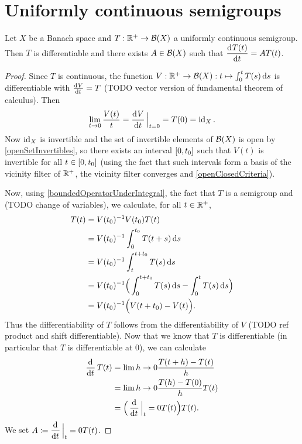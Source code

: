 \section{Uniformly continuous semigroups}

\begin{proposition}
Let $X$ be a Banach space and $T: \mathbb{R}^+\to \operatorname{\mathcal{B}}(X)$ a uniformly continuous semigroup. Then $T$ is differentiable and there exists $A\in \operatorname{\mathcal{B}}(X)$ such that $\mathinner{ \dfrac{\operatorname{d \!}{^{}}T(t)}{\operatorname{d \!}{{t}^{}}} } = AT(t)$.
\end{proposition}
\begin{proof}
Since $T$ is continuous, the function $V: \mathbb{R}^+ \to \operatorname{\mathcal{B}}(X): t\mapsto \int_0^t T(s)\operatorname{d \!}{s}$ is differentiable with $\od{V}{t} = T$ (TODO vector version of fundamental theorem of calculus). Then
\[ \lim_{t\to 0}\frac{V(t)}{t} = \mathinner{ \dfrac{\operatorname{d \!}{^{}}V}{\operatorname{d \!}{{t}^{}}} }\Big|_{t=0} = T(0) = \operatorname{id}_X. \]
Now $\operatorname{id}_X$ is invertible and the set of invertible elements of $\operatorname{\mathcal{B}}(X)$ is open by \ref{openSetInvertibles}, so there exists an interval $\interval{0,t_0}$ such that $V(t)$ is invertible for all $t\in \interval{0,t_0}$ (using the fact that such intervals form a basis of the vicinity filter of $\mathbb{R}^+$, the vicinity filter converges and \ref{openClosedCriteria}).

Now, using \ref{boundedOperatorUnderIntegral}, the fact that $T$ is a semigroup and (TODO change of variables), we calculate, for all $t\in \mathbb{R}^+$,
\begin{align*}
T(t) &= V(t_0)^{-1}V(t_0)T(t) \\
&= V(t_0)^{-1}\int_0^{t_0}T(t+s)\operatorname{d \!}{s} \\
&= V(t_0)^{-1}\int_t^{t+t_0}T(s)\operatorname{d \!}{s} \\
&= V(t_0)^{-1}\Big(\int_0^{t+t_0}T(s)\operatorname{d \!}{s} - \int_0^{t}T(s)\operatorname{d \!}{s}\Big) \\
&= V(t_0)^{-1}\Big(V(t+t_0) - V(t)\Big).
\end{align*}
Thus the differentiability of $T$ follows from the differentiability of $V$ (TODO ref product and shift differentiable). Now that we know that $T$ is differentiable (in particular that $T$ is differentiable at $0$), we can calculate
\begin{align*}
\mathinner{ \dfrac{\operatorname{d \!}{^{}}}{\operatorname{d \!}{{t}^{}}} }T(t) &= \lim{h\to 0} \frac{T(t+h) - T(t)}{h} \\
&= \lim{h\to 0} \frac{T(h) - T(0)}{h}T(t) \\
&= \Big(\mathinner{ \dfrac{\operatorname{d \!}{^{}}}{\operatorname{d \!}{{t}^{}}} }\Big|_t=0 T(t)\Big)T(t).
\end{align*}
We set $A\coloneqq \mathinner{ \dfrac{\operatorname{d \!}{^{}}}{\operatorname{d \!}{{t}^{}}} }\Big|_t=0 T(t)$.
\end{proof}

